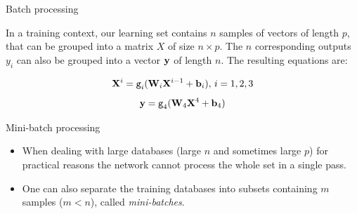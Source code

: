 \documentclass[xcolor=pdftex,dvipsnames,table,mathserif]{beamer}
\begin{document}

\begin{frame}{Batch processing}

  In a training context, our learning set contains $n$ samples of vectors of length $p$, that can be grouped into a matrix $X$ of size $n \times p$. The $n$ corresponding outputs $y_i$ can also be grouped into a vector $\mathbf{y}$ of length $n$. The resulting equations are:

  \begin{block}{}
    \[\mathbf{X}^i = \texttt{g}_i(\mathbf{W}_i\mathbf{X}^{i-1} + \mathbf{b}_i),\, i= 1, 2, 3 \]
    \[\mathbf{y} = \texttt{g}_4(\mathbf{W}_4\mathbf{X}^4 + \mathbf{b}_4)\]
  \end{block}


\end{frame}

\begin{frame}{Mini-batch processing}

  \begin{itemize}[<+->]
  \item   When dealing with large databases (large $n$ and sometimes large $p$) for practical reasons the network cannot process the whole set in a single pass.
  \item   One can also separate the training databases into subsets containing $m$ samples ($m < n$), called \emph{mini-batches}.
\end{itemize}


\end{frame}
\end{document}
